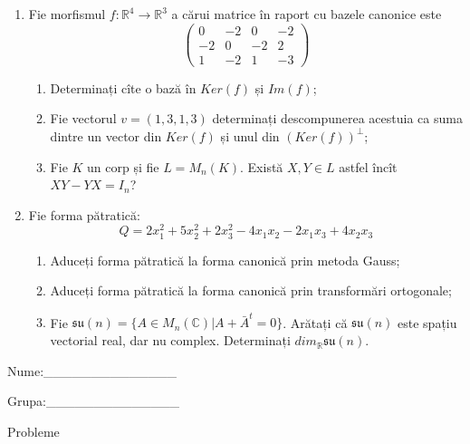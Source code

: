 \documentclass{article}
\begin{document}
\begin{enumerate}
 \item Fie morfismul $f:\mathbb{R}^4 \to \mathbb{R}^3$ a cărui matrice în raport cu bazele canonice este
$$\begin{pmatrix}
0&-2&0&-2\\
-2&0&-2&2\\
1&-2&1&-3
\end{pmatrix}$$

\begin{enumerate}
\item Determinați cîte o bază în $Ker(f)$ și $Im(f)$;
\item Fie vectorul $v=(1,3,1,3)$ determinați descompunerea acestuia ca suma dintre un vector din $Ker(f)$ și unul din $(Ker(f))^\perp$;
\item Fie $K$ un corp și fie $L=M_n(K)$. Există $X,Y \in L$ astfel încît $XY-YX=I_n$?  
\end{enumerate}
\item Fie forma pătratică:
$$Q= 2x_1^2+5x_2^2+2x_3^2-4x_1x_2-2x_1x_3+4x_2x_3$$

\begin{enumerate}
\item Aduceți forma pătratică la forma canonică prin metoda Gauss;
\item Aduceți forma pătratică la forma canonică prin transformări ortogonale;
\item Fie $\mathfrak{su}(n)=\{ A \in M_n(\mathbb{C}) | A+\bar{A}^t=0\}$. Arătați că $\mathfrak{su}(n)$ este spațiu vectorial real, dar nu complex.
Determinați $dim_{\mathbb{R}}\mathfrak{su}(n)$.
\end{enumerate}
\end{enumerate}
\newpage
\begin{flushright}
Nume:\_\_\_\_\_\_\_\_\_\_\_\_\_\_
 
 
Grupa:\_\_\_\_\_\_\_\_\_\_\_\_\_\_
\end{flushright}
\begin{center}
\vspace{2cm}
{\Large Probleme}
\vspace{2cm}
\end{center}
\end{document}
